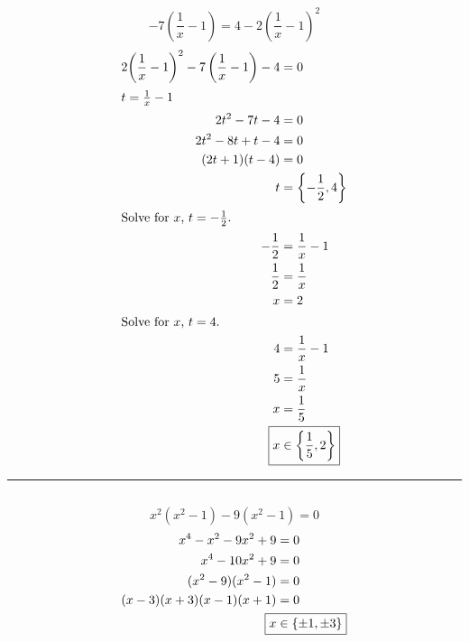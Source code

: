 	\subsection{}
		\[-7\left(\frac{1}{x} - 1\right) = 4 - 2{\left(\frac{1}{x} - 1\right)}^2\]
		\begin{align*}
			2{\left(\frac{1}{x} - 1\right)}^2 - 7\left(\frac{1}{x} - 1\right) - 4 &= 0 \\
			\intertext{$t = \frac{1}{x} - 1$}
			2t^2 - 7t - 4 &= 0 \\
			2t^2 - 8t + t - 4 &= 0 \\
			(2t + 1)(t - 4) &= 0 \\
			t &= \left\{-\frac{1}{2}, 4\right\} \\
			\intertext{Solve for $x$, $t = -\frac{1}{2}$.}
			-\frac{1}{2} &= \frac{1}{x} - 1 \\
			\frac{1}{2} &= \frac{1}{x} \\
			x &= 2 \\
			\intertext{Solve for $x$, $t = 4$.}
			4 &= \frac{1}{x} - 1 \\
			5 &= \frac{1}{x} \\
			x &= \frac{1}{5} \\
			\Aboxed{x &\in \left\{\frac{1}{5}, 2\right\}}
		\end{align*}
		\hrule{}

	\subsection{}
		\[x^2(x^2 - 1) - 9(x^2 - 1) = 0\]
		\begin{align*}
			x^4 - x^2 - 9x^2 + 9 &= 0 \\
			x^4 - 10x^2 + 9 &= 0 \\
			(x^2 - 9)(x^2 - 1) &= 0 \\
			(x - 3)(x + 3)(x - 1)(x + 1) &= 0 \\
			\Aboxed{x &\in \{\pm 1, \pm 3\}}
		\end{align*}
		\pagebreak{}

